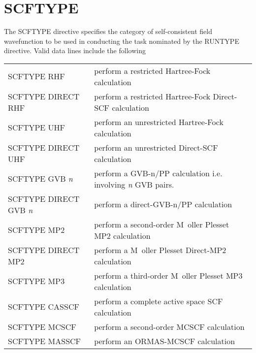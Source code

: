 \documentclass[11pt,fleqn]{article}
\begin{document}
\section[SCFTYPE]{SCFTYPE}

The SCFTYPE directive specifies the category of self-consistent field
wavefunction to be used in conducting the task nominated by the RUNTYPE
directive.  Valid data lines include the following


\begin{tabular}{ll}
\\ \hline
SCFTYPE RHF         &  perform a restricted Hartree-Fock calculation \\
SCFTYPE DIRECT RHF  &  perform a restricted Hartree-Fock Direct-SCF calculation \\
SCFTYPE UHF         &  perform an unrestricted Hartree-Fock calculation \\
SCFTYPE DIRECT UHF  &  perform an unrestricted Direct-SCF calculation \\
SCFTYPE GVB {\em n} &   perform a GVB-n/PP calculation i.e. involving {\em n}  GVB pairs. \\
SCFTYPE DIRECT GVB {\em n} & perform a direct-GVB-n/PP calculation \\
SCFTYPE MP2         & perform a second-order M\ oller Plesset MP2 calculation \\
SCFTYPE DIRECT MP2  &  perform a M\ oller Plesset Direct-MP2 calculation \\
SCFTYPE MP3         & perform a third-order M\ oller Plesset MP3 calculation \\
SCFTYPE CASSCF      & perform a complete active space SCF calculation \\
SCFTYPE MCSCF       & perform a second-order  MCSCF calculation \\
SCFTYPE MASSCF      & perform an ORMAS-MCSCF calculation \\ \hline
\end{tabular}
\end{document}
